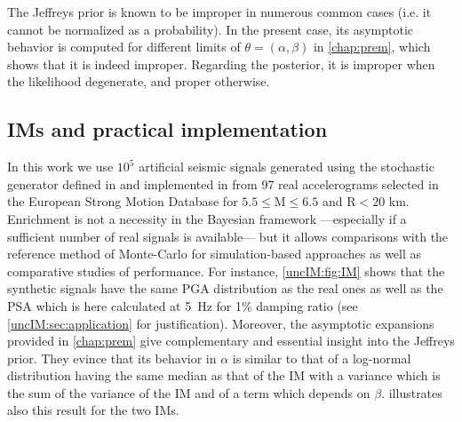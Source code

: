         The Jeffreys prior is known to be improper in numerous common cases (i.e. it cannot be normalized as a probability). In the present case, its asymptotic behavior is computed for different limits of $\theta = (\alpha,\beta)$ in \cref{chap:prem}, which shows that it is indeed improper. 
        Regarding the posterior, it is improper when the likelihood degenerate, and proper otherwise.

        \subsection{IMs and practical implementation} \label{uncIM:sec:practseism}
        
In this work we use $10^5$ artificial seismic signals generated using the stochastic generator defined in \cite{rezaeian_stochastic_2010} and implemented in \cite{sainct_efficient_2020} from 97 real accelerograms selected in the European Strong Motion Database for $5.5 \leq \text{M} \leq 6.5$ and $\text{R} < 20$ km. Enrichment is not a necessity in the Bayesian framework ---especially if a sufficient number of real signals is available--- but it allows comparisons with the reference method of Monte-Carlo for simulation-based approaches as well as comparative studies of performance. For instance, \cref{uncIM:fig:IM} shows that the synthetic signals have the same PGA distribution as the real ones as well as the PSA which is here calculated at 5~Hz for 1\% damping ratio (see \cref{uncIM:sec:application} for justification). Moreover, the asymptotic expansions provided in \cref{chap:prem} give complementary and essential insight into the Jeffreys prior. They evince that its behavior in $\alpha$ is similar to that of a log-normal distribution having the same median as that of the IM with a variance which is the sum of the variance of the IM and of a term which depends on $\beta$.  illustrates also this result for the two IMs.

